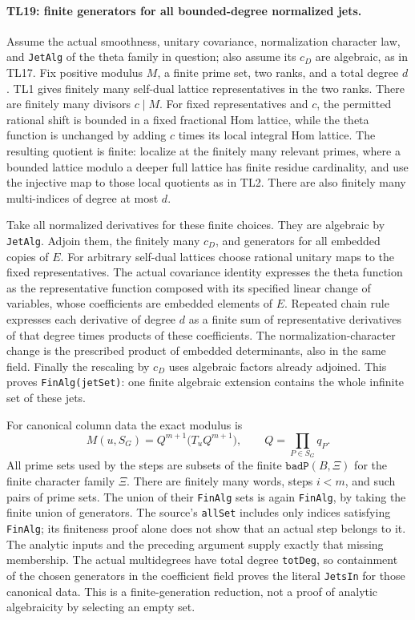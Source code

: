 \paragraph{TL19: finite generators for all bounded-degree normalized
jets.}
Assume the actual smoothness, unitary covariance, normalization
character law, and \texttt{JetAlg} of the theta family in question;
also assume its $c_D$ are algebraic, as in TL17. Fix positive
modulus $M$, a finite prime set, two ranks, and a total degree
$d$. TL1 gives finitely many self-dual lattice representatives
in the two ranks. There are finitely many divisors $c\mid M$.
For fixed representatives and $c$, the permitted rational shift
is bounded in a fixed fractional Hom lattice, while the theta
function is unchanged by adding $c$ times its local integral
Hom lattice. The resulting quotient is finite: localize at the
finitely many relevant primes, where a bounded lattice modulo
a deeper full lattice has finite residue cardinality, and use
the injective map to those local quotients as in TL2.
There are also finitely many multi-indices of degree at most
$d$.

Take all normalized derivatives for these finite choices.
They are algebraic by \texttt{JetAlg}. Adjoin them, the finitely
many $c_D$, and generators for all embedded copies of $E$.
For arbitrary self-dual lattices choose rational unitary maps
to the fixed representatives. The actual covariance identity
expresses the theta function as the representative function
composed with its specified linear change of variables, whose
coefficients are embedded elements of $E$. Repeated chain rule
expresses each derivative of degree $d$ as a finite sum of
representative derivatives of that degree times products of
these coefficients. The normalization-character change is
the prescribed product of embedded determinants, also in the
same field. Finally the rescaling by $c_D$ uses algebraic
factors already adjoined. This proves \texttt{FinAlg(jetSet)}:
one finite algebraic extension contains the whole infinite
set of these jets.

For canonical column data the exact modulus is
\[
 M(u,S_G)=Q^{m+1}\bigl(T_u Q^{m+1}\bigr),
 \qquad Q=\prod_{P\in S_G}q_P.                    \tag{TL.21}
\]
All prime sets used by the steps are subsets of the finite
$\texttt{badP}(B,\Xi)$ for the finite character family $\Xi$.
There are finitely many words, steps $i<m$, and such pairs of
prime sets. The union of their \texttt{FinAlg} sets is again
\texttt{FinAlg}, by taking the finite union of generators.
The source's \texttt{allSet} includes only indices satisfying
\texttt{FinAlg}; its finiteness proof alone does not show that
an actual step belongs to it. The analytic inputs and the
preceding argument supply exactly that missing membership.
The actual multidegrees have total degree \texttt{totDeg},
so containment of the chosen generators in the coefficient
field proves the literal \texttt{JetsIn} for those canonical
data. This is a finite-generation reduction, not a proof of
analytic algebraicity by selecting an empty set.

